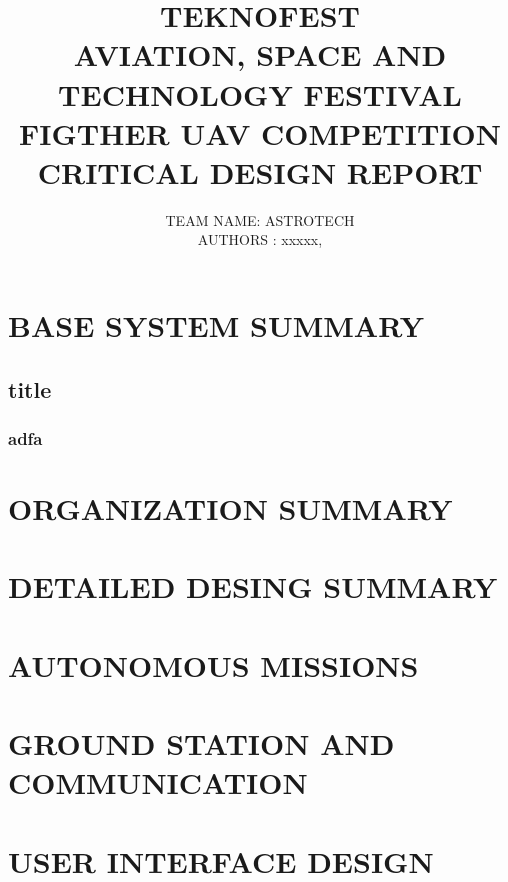 \documentclass[12pt]{article}
\begin{document}
\begin{titlepage}
	\centering
	\title{ %
		TEKNOFEST \\
		AVIATION, SPACE AND TECHNOLOGY FESTIVAL \\
		FIGTHER UAV COMPETITION \\
		CRITICAL DESIGN REPORT \\}
	\author{
		TEAM NAME: ASTROTECH \\
		AUTHORS : xxxxx,\\} %
	\date{}
	\maketitle
\end{titlepage}	

\clearpage
{}
\tableofcontents %

\clearpage

\section{BASE SYSTEM SUMMARY}
\subsection{title}
\subsubsection{adfa}
\Blindtext
\section{ORGANIZATION SUMMARY}
\cite[aasdfjasdf]{greenwade93}
\section{DETAILED DESING SUMMARY}

\section{AUTONOMOUS MISSIONS}

\section{GROUND STATION AND COMMUNICATION}

\section{USER INTERFACE DESIGN}
\end{document}

